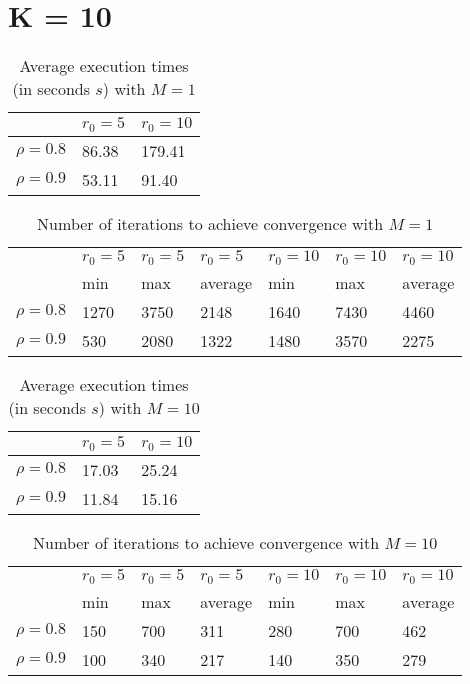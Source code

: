 \documentclass[a4paper,11pt,openright]{report}
\begin{document}
\section*{K = 10}
\begin{table}[H]
\centering
\addtolength{\leftskip}{-1.5cm}
\addtolength{\rightskip}{-1.5cm}
\begin{tabular}{|c|ll|}
\hline
$ $ & $r_0 = 5$ & $r_0 = 10$ \\
\hline
$\rho = 0.8$ & 86.38 & 179.41 \\
$\rho = 0.9$ & 53.11 & 91.40 \\
\hline
\end{tabular}
\caption{Average execution times (in seconds $s$) with $M = 1$}
\end{table}
\begin{table}[H]
\centering
\addtolength{\leftskip}{-1.5cm}
\addtolength{\rightskip}{-1.5cm}
\begin{tabular}{|c|llllll|}
\hline
$ $ & $r_0 = 5$ & $r_0 = 5$ & $r_0 = 5$ & $r_0 = 10$ & $r_0 = 10$ & $r_0 = 10$ \\
$ $ & min & max & average & min & max & average \\
\hline
$\rho = 0.8$ & 1270 & 3750 & 2148 & 1640 & 7430 & 4460 \\
$\rho = 0.9$ & 530 & 2080 & 1322 & 1480 & 3570 & 2275 \\
\hline
\end{tabular}
\caption{Number of iterations to achieve convergence with $M = 1$}
\end{table}
\begin{table}[H]
\centering
\addtolength{\leftskip}{-1.5cm}
\addtolength{\rightskip}{-1.5cm}
\begin{tabular}{|c|ll|}
\hline
$ $ & $r_0 = 5$ & $r_0 = 10$ \\
\hline
$\rho = 0.8$ & 17.03 & 25.24 \\
$\rho = 0.9$ & 11.84 & 15.16 \\
\hline
\end{tabular}
\caption{Average execution times (in seconds $s$) with $M = 10$}
\end{table}
\begin{table}[H]
\centering
\addtolength{\leftskip}{-1.5cm}
\addtolength{\rightskip}{-1.5cm}
\begin{tabular}{|c|llllll|}
\hline
$ $ & $r_0 = 5$ & $r_0 = 5$ & $r_0 = 5$ & $r_0 = 10$ & $r_0 = 10$ & $r_0 = 10$ \\
$ $ & min & max & average & min & max & average \\
\hline
$\rho = 0.8$ & 150 & 700 & 311 & 280 & 700 & 462 \\
$\rho = 0.9$ & 100 & 340 & 217 & 140 & 350 & 279 \\
\hline
\end{tabular}
\caption{Number of iterations to achieve convergence with $M = 10$}
\end{table}
\end{document}
